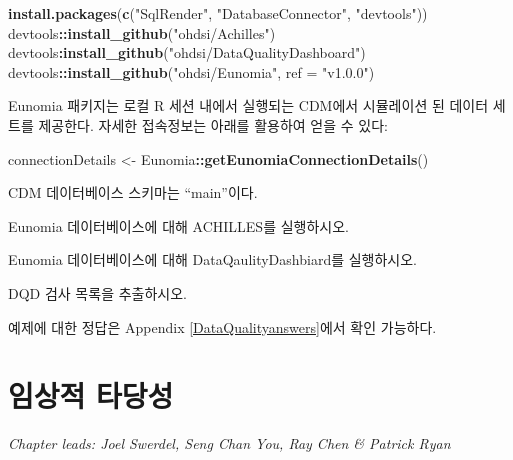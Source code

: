 \documentclass[11pt]{book}
\newenvironment{Shaded}{\begin{snugshade}}{\end{snugshade}}
\newcommand{\KeywordTok}[1]{\textcolor[rgb]{0.13,0.29,0.53}{\textbf{#1}}}
\newcommand{\DataTypeTok}[1]{\textcolor[rgb]{0.13,0.29,0.53}{#1}}
\newcommand{\StringTok}[1]{\textcolor[rgb]{0.31,0.60,0.02}{#1}}
\newcommand{\OperatorTok}[1]{\textcolor[rgb]{0.81,0.36,0.00}{\textbf{#1}}}
\newcommand{\NormalTok}[1]{#1}
\theoremstyle{definition}
\theoremstyle{definition}
\theoremstyle{definition}
\theoremstyle{remark}
\let\BeginKnitrBlock\begin \let\EndKnitrBlock\end
\begin{document}
\begin{Shaded}
\begin{Highlighting}[]
\KeywordTok{install.packages}\NormalTok{(}\KeywordTok{c}\NormalTok{(}\StringTok{"SqlRender"}\NormalTok{, }\StringTok{"DatabaseConnector"}\NormalTok{, }\StringTok{"devtools"}\NormalTok{))}
\NormalTok{devtools}\OperatorTok{::}\KeywordTok{install_github}\NormalTok{(}\StringTok{"ohdsi/Achilles"}\NormalTok{)}
\NormalTok{devtools}\OperatorTok{:}\KeywordTok{install_github}\NormalTok{(}\StringTok{"ohdsi/DataQualityDashboard"}\NormalTok{)}
\NormalTok{devtools}\OperatorTok{::}\KeywordTok{install_github}\NormalTok{(}\StringTok{"ohdsi/Eunomia"}\NormalTok{, }\DataTypeTok{ref =} \StringTok{"v1.0.0"}\NormalTok{)}
\end{Highlighting}
\end{Shaded}

Eunomia 패키지는 로컬 R 세션 내에서 실행되는 CDM에서 시뮬레이션 된
데이터 세트를 제공한다. 자세한 접속정보는 아래를 활용하여 얻을 수 있다:

\begin{Shaded}
\begin{Highlighting}[]
\NormalTok{connectionDetails <-}\StringTok{ }\NormalTok{Eunomia}\OperatorTok{::}\KeywordTok{getEunomiaConnectionDetails}\NormalTok{()}
\end{Highlighting}
\end{Shaded}

CDM 데이터베이스 스키마는 ``main''이다.

\BeginKnitrBlock{exercise}
\protect\hypertarget{exr:exerciseRunAchilles}{}{\label{exr:exerciseRunAchilles}
}Eunomia 데이터베이스에 대해 ACHILLES를 실행하시오.
\EndKnitrBlock{exercise}

\BeginKnitrBlock{exercise}
\protect\hypertarget{exr:exerciseRunDQD}{}{\label{exr:exerciseRunDQD}
}Eunomia 데이터베이스에 대해 DataQaulityDashbiard를 실행하시오.
\EndKnitrBlock{exercise}

\BeginKnitrBlock{exercise}
\protect\hypertarget{exr:exerciseViewDQD}{}{\label{exr:exerciseViewDQD} }DQD
검사 목록을 추출하시오.
\EndKnitrBlock{exercise}

예제에 대한 정답은 Appendix \ref{DataQualityanswers}에서 확인 가능하다.

\chapter{임상적 타당성}\label{ClinicalValidity}

\emph{Chapter leads: Joel Swerdel, Seng Chan You, Ray Chen \& Patrick
Ryan}
\end{document}
